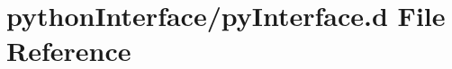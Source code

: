 \hypertarget{py_interface_8d}{\section{python\-Interface/py\-Interface.d File Reference}
\label{py_interface_8d}
}
